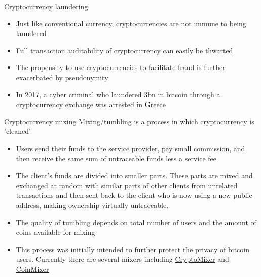 \documentclass[11pt]{beamer}
\begin{document}

\begin{frame}{Cryptocurrency laundering}
	\begin{itemize}
		\item Just like conventional currency, cryptocurrencies are not immune to being laundered
		\item Full transaction auditability of cryptocurrency can easily be thwarted
		\item The propensity to use cryptocurrencies to facilitate fraud is further exacerbated by pseudonymity
		\item In 2017, a cyber criminal who laundered \textsterling3bn in bitcoin through a cryptocurrency exchange was arrested in Greece
	\end{itemize}
\end{frame}


\begin{frame}{Cryptocurrency mixing}
	Mixing/tumbling is a process in which cryptocurrency is 'cleaned'
	\begin{itemize}
		\item Users send their funds to the service provider, pay small commission, and then receive the same sum of untraceable funds less a service fee
		\item The client's funds are divided into smaller parts. These parts are mixed and exchanged at random with similar parts of other clients from unrelated transactions and then sent back to the client who is now using a new public address, making ownership virtually untraceable.
		\item The quality of tumbling depends on total number of users and the amount of coins available for mixing
		\item This process was initially intended to further protect the privacy of bitcoin users. Currently there are several mixers including \href{https://cryptomixer.io}{CryptoMixer} and \href{https://coinmixer.se/en/}{CoinMixer}
	\end{itemize}
\end{frame}

\end{document}
